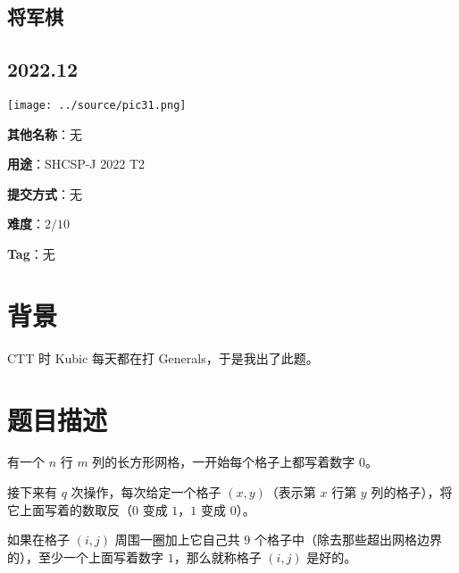 \documentclass[a4paper,10pt]{article}
\begin{document}
\vspace*{\fill}
\begin{center}

\section{将军棋}

\subsection*{2022.12}

\vspace{10pt}

\texttt{[image: ../source/pic31.png]}

\vspace{10pt}

\textbf{其他名称}：无

\vspace{10pt}

\textbf{用途}：SHCSP-J 2022 T2

\vspace{10pt}

\textbf{提交方式}：无

\vspace{10pt}

\textbf{难度}：$2/10$

\vspace{10pt}

\textbf{Tag}：无

\end{center}
\vspace*{\fill}

\newpage

\section*{背景}

CTT 时 Kubic 每天都在打 Generals，于是我出了此题。

\section*{题目描述}

有一个 $n$ 行 $m$ 列的长方形网格，一开始每个格子上都写着数字 $0$。

接下来有 $q$ 次操作，每次给定一个格子 $(x,y)$（表示第 $x$ 行第 $y$ 列的格子），将它上面写着的数取反（$0$ 变成 $1$，$1$ 变成 $0$）。

如果在格子 $(i,j)$ 周围一圈加上它自己共 $9$ 个格子中（除去那些超出网格边界的），至少一个上面写着数字 $1$，那么就称格子 $(i,j)$ 是好的。
\end{document}
